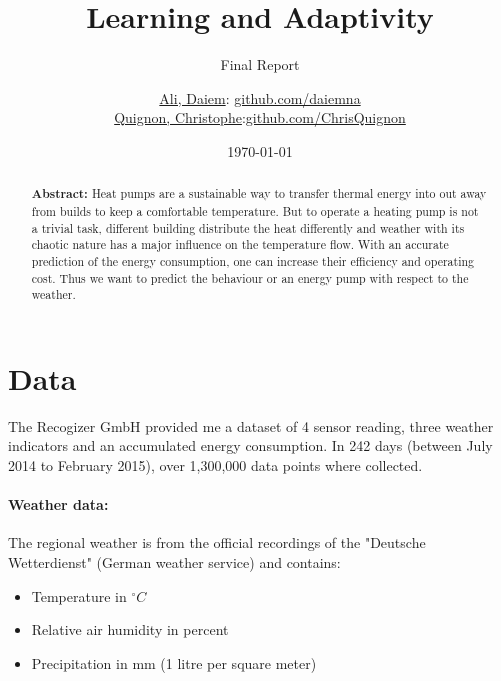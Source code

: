 \documentclass{scrartcl}
\begin{document}
\title{Learning and Adaptivity}
\subtitle{Final Report}
\author{
  \href{daiem.ali@smail.inf.h-brs.de}{Ali, Daiem}: \href{https://github.com/daiemna}{github.com/daiemna}\\
  \href{christophe.quignon@smail.inf.h-brs.de}{Quignon, Christophe}:\href{https://github.com/ChrisQuignon}{github.com/ChrisQuignon}
}
\date{\today}


\maketitle


\begin{abstract}
\textbf{Abstract:}
Heat pumps are a sustainable way to transfer thermal energy into out away from builds to keep a comfortable temperature. But to operate a heating pump is not a trivial task, different building distribute the heat differently and weather with its chaotic nature has a major influence on the temperature flow. With an accurate prediction of the energy consumption, one can increase their efficiency and operating cost.
Thus we want to predict the behaviour or an energy pump with respect to the weather.\\
\end{abstract}

\section{Data}
\label{sec:data}

The Recogizer GmbH provided me a dataset of 4 sensor reading, three weather indicators and an accumulated energy consumption. In 242 days (between July 2014 to February 2015), over 1,300,000 data points where collected.

\paragraph{Weather data:}
The regional weather is from the official recordings of the "Deutsche Wetterdienst" (German weather service) and contains:

\begin{itemize}
\item Temperature in $^\circ C$
\item Relative air humidity in percent
\item Precipitation in mm (1 litre per square meter)
\end{itemize}
\end{document}
